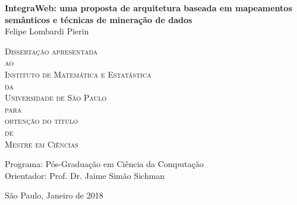 \documentclass[11pt,twoside,a4paper]{book}
\begin{document}
\frontmatter 
\fancyhead[RO]{{\footnotesize\rightmark}\hspace{2em}\thepage}
\setcounter{tocdepth}{2}
\fancyhead[LE]{\thepage\hspace{2em}\footnotesize{\leftmark}}
\fancyhead[RE,LO]{}
\fancyhead[RO]{{\footnotesize\rightmark}\hspace{2em}\thepage}

\onehalfspacing  %

\thispagestyle{empty}
\begin{center}
    \vspace*{2.3cm}
    \textbf{\Large{IntegraWeb: uma proposta de arquitetura baseada em
mapeamentos semânticos e técnicas de mineração de dados}}\\
    
    \vspace*{1.2cm}
    \Large{Felipe Lombardi Pierin}
    
    \vskip 2cm
    \textsc{
    Dissertação apresentada\\[-0.25cm] 
    ao\\[-0.25cm]
    Instituto de Matemática e Estatástica\\[-0.25cm]
    da\\[-0.25cm]
    Universidade de São Paulo\\[-0.25cm]
    para\\[-0.25cm]
    obtenção do título\\[-0.25cm]
    de\\[-0.25cm]
    Mestre em Ciências}
    
    \vskip 1.5cm
    Programa: Pós-Graduação em Ciência da Computação\\
    Orientador: Prof. Dr. Jaime Simão Sichman

   	\vskip 1cm
    \normalsize{}
    
    \vskip 0.5cm
    \normalsize{São Paulo, Janeiro de 2018}
\end{center}

%
%
%
\end{document}
